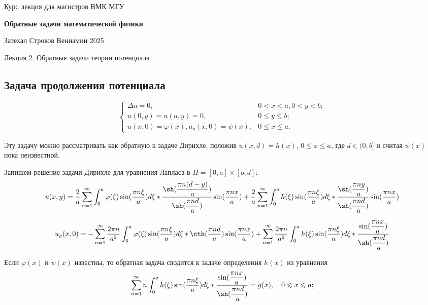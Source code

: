 \documentclass{article}
\begin{document}
\centerline{\large Курс лекция для магистров ВМК МГУ}
\centerline {\textbf{\LARGE Обратные задачи математической физики}}
\centerline {Затехал Строков Вениамин 2025}

\vspace{0.4cm}

\centerline{\LARGE Лекция 2. Обратные задачи теории потенциала}

\vspace{0.5cm}

\subsection{Задача продолжения потенциала}

\begin{equation*}
\begin{cases}
	\Delta u = 0, & 0 < x < a, 0 < y < b;\\
	u(0,y) = u(a,y) = 0, & 0 \leqslant y \leqslant b;\\
	u(x,0) = \varphi(x), u_y(x,0) = \psi(x), & 0 \leqslant x \leqslant a.
\end{cases}
\end{equation*}

Эту задачу можно рассматривать как обратную к задаче Дирихле, положив $u(x,d) = h(x)$, $0 \leqslant x \leqslant a$, где $d \in (0,b]$ и считая $\psi(x)$ пока неизвестной. 

Запишем решение задачи Дирихле для уравнения Лапласа в $\Pi = [0,a] \times [o,d]$:
\[
	u(x,y) = 
	\dfrac{2}{a} \sum_{n=1}^{\infty} \int_0^a \varphi(\xi) \sin(\dfrac{ \pi n \xi }{a}) d \xi *
	\dfrac{\sh (\dfrac{\pi n (d-y)}{a})}{\sh( \dfrac{\pi n d}{a})} \sin (\dfrac{\pi n x}{a}) +
	\dfrac{2}{a} \sum_{n=1}^{\infty} \int_0^a h(\xi) \sin(\dfrac{ \pi n \xi }{a}) d \xi *
	\dfrac{\sh (\dfrac{\pi n y}{a})}{\sh (\dfrac{\pi n d}{a})} \sin( \dfrac{\pi n x}{a})
\]

\[ %
	u_y(x,0) = 
	- \sum_{n=1}^{\infty} \dfrac{2 \pi n}{a^2} \int_0^a \varphi(\xi) \sin(\dfrac{ \pi n \xi }{a}) d \xi*
	\cth( \dfrac{\pi n d}{a} )\sin( \dfrac{\pi n x}{a} )+
	\sum_{n=1}^{\infty} \dfrac{2 \pi n}{a^2} \int_0^a h(\xi) \sin(\dfrac{ \pi n \xi }{a}) d \xi *
	\dfrac{\sin( \dfrac{\pi n x}{a})}{\sh (\dfrac{\pi n d}{a})} 
\]

Если $\varphi(x)$ и $\psi(x)$ известны, то обратная задача сводится к задаче определения $h(x)$ из уравнения
\[
	\sum_{n=1}^{\infty} n \int_0^a h(\xi) \sin(\dfrac{ \pi n \xi }{a}) d \xi *
	\dfrac{\sin( \dfrac{\pi n x}{a})}{\sh (\dfrac{\pi n d}{a})} = g(x), \quad 0 \leqslant x \leqslant a;
\]
\end{document}
